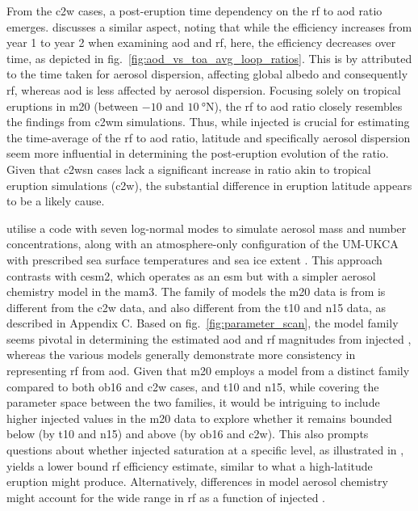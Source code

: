 \documentclass{ametsocV6.1}
\newcommand{\iso}[1][i]{{#1}njected \ce{SO2}}
\begin{document}
From the \gls{c2w} cases, a post-eruption time dependency on the \gls{rf} to \gls{aod}
ratio emerges. \citet{marshall2020} discusses a similar aspect, noting that while the
efficiency increases from year 1 to year 2 when examining \gls{aod} and \gls{rf}, here,
the efficiency decreases over time, as depicted in
fig.~\ref{fig:aod_vs_toa_avg_loop_ratios}. This is by \citet{marshall2020} attributed to
the time taken for aerosol dispersion, affecting global albedo and consequently
\gls{rf}, whereas \gls{aod} is less affected by aerosol dispersion. Focusing solely on
tropical eruptions in \gls{m20} (between \(-10\) and \(\SI{10}{\degree\mathrm{N}}\)),
the \gls{rf} to \gls{aod} ratio closely resembles the findings from \gls{c2wm}
simulations. Thus, while \iso{} is crucial for estimating the time-average of the
\gls{rf} to \gls{aod} ratio, latitude and specifically aerosol dispersion seem more
influential in determining the post-eruption evolution of the ratio. Given that
\gls{c2wsn} cases lack a significant increase in ratio akin to tropical eruption
simulations (\gls{c2w}), the substantial difference in eruption latitude appears to be a
likely cause.

\citet{marshall2019, marshall2020, marshall2021} utilise a code with seven log-normal
modes to simulate aerosol mass and number concentrations, along with an atmosphere-only
configuration of the UM-UKCA with prescribed sea surface temperatures and sea ice extent
\citep{marshall2019}. This approach contrasts with \gls{cesm2}, which operates as an
\gls{esm} but with a simpler aerosol chemistry model in the \gls{mam3}. The family of
models the \gls{m20} data is from is different from the \gls{c2w} data, and also
different from the \gls{t10} and \gls{n15} data, as described in Appendix C. Based on
fig.~\ref{fig:parameter_scan}, the model family seems pivotal in determining the
estimated \gls{aod} and \gls{rf} magnitudes from \iso{}, whereas the various models
generally demonstrate more consistency in representing \gls{rf} from \gls{aod}. Given
that \gls{m20} employs a model from a distinct family compared to both \gls{ob16} and
\gls{c2w} cases, and \gls{t10} and \gls{n15}, while covering the parameter space between
the two families, it would be intriguing to include higher \iso{} values in the
\gls{m20} data to explore whether it remains bounded below (by \gls{t10} and \gls{n15})
and above (by \gls{ob16} and \gls{c2w}). This also prompts questions about whether
\iso{} saturation at a specific level, as illustrated in \citet{niemeier2015}, yields a
lower bound \gls{rf} efficiency estimate, similar to what a high-latitude eruption might
produce. Alternatively, differences in model aerosol chemistry might account for the
wide range in \gls{rf} as a function of \iso{}.
\end{document}
